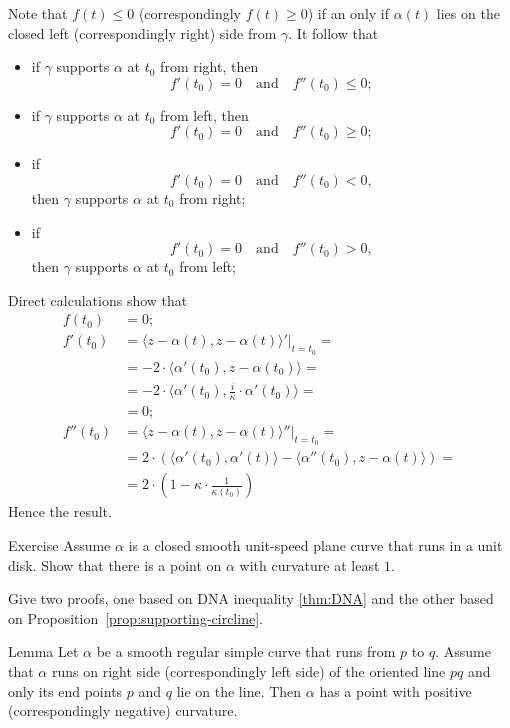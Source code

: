 Note that $f(t)\le0$ (correspondingly $f(t)\ge0$) 
if an only if $\alpha(t)$ lies on the closed left (correspondingly right) side from $\gamma$.
It follow that 
\begin{itemize}
\item if $\gamma$ supports $\alpha$ at $t_0$ from right, 
then
\[f'(t_0)=0\quad\text{and}\quad f''(t_0)\le 0;\]

\item if $\gamma$ supports $\alpha$ at $t_0$ from  left, 
then 
\[f'(t_0)=0\quad\text{and}\quad f''(t_0)\ge 0;\]

\item if 
\[f'(t_0)=0\quad\text{and}\quad f''(t_0)< 0,\]
then $\gamma$ supports $\alpha$ at $t_0$ from  right;

\item if 
\[f'(t_0)=0\quad\text{and}\quad f''(t_0)> 0,\] then $\gamma$ supports $\alpha$ at $t_0$ from  left;
\end{itemize}

Direct calculations show that
\begin{align*}
f(t_0)&=0;
\\
f'(t_0)&=\left.\langle z-\alpha(t),z-\alpha(t) \rangle'\right|_{t=t_0}=
\\
&=-2\cdot \langle \alpha'(t_0),z-\alpha(t_0) \rangle=
\\&=-2\cdot \langle \alpha'(t_0),\tfrac i\kappa \cdot\alpha'(t_0) \rangle=
\\
&=0;
\\
f''(t_0)&=\langle z-\alpha(t),z-\alpha(t) \rangle''|_{t=t_0}=
\\
&=2\cdot\left( \langle \alpha'(t_0),\alpha'(t) \rangle-\langle \alpha''(t_0),z-\alpha(t) \rangle \right)=
\\
&=2\cdot\left(1-\kappa\cdot \frac1{\kappa(t_0)}\right)
\end{align*}
Hence the result.\qeds


\begin{thm}{Exercise}
Assume $\alpha$ is a closed smooth unit-speed plane curve that runs in a unit disk.
Show that there is a point on $\alpha$ with curvature at least $1$.

Give two proofs, one based on DNA inequality \ref{thm:DNA} and the other based on Proposition~\ref{prop:supporting-circline}.
\end{thm}

\begin{thm}{Lemma}\label{lem:lens}
Let $\alpha$ be a smooth regular simple curve that runs from $p$ to $q$.
Assume that $\alpha$ runs on right side (correspondingly left side) of the oriented line $pq$ and only its end points $p$ and $q$ lie on the line.
Then $\alpha$ has a point with positive  (correspondingly negative) curvature.
\end{thm}

